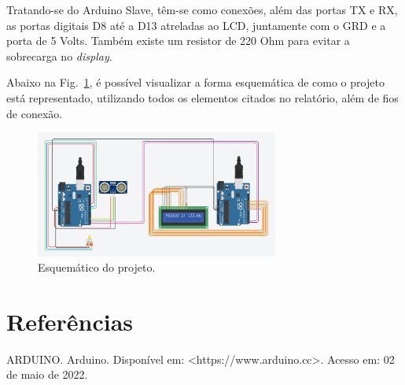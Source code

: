 \documentclass[conference]{IEEEtran}
\begin{document}
    Tratando-se do Arduino Slave, têm-se como conexões, além das portas TX e RX, as portas digitais D8 até
a D13 atreladas ao LCD, juntamente com o GRD e a porta de 5 Volts. Também existe um resistor de 220 Ohm para
evitar a sobrecarga no \emph{display}.

Abaixo na Fig.~\ref{fig5}, é possível visualizar a forma esquemática de como o projeto está 
representado, utilizando todos os elementos citados no relatório, além de fios de conexão.

\begin{figure}[htbp]
    \centerline{
        \includegraphics[width=8cm]{imagens/esquematico.png}
        }
    \caption{Esquemático do projeto.}
    \label{fig5}
    \end{figure}

\section{Referências}
    ARDUINO. Arduino. Disponível em: <https://www.arduino.cc>. Acesso em: 02 de maio de 2022.
\end{document}
